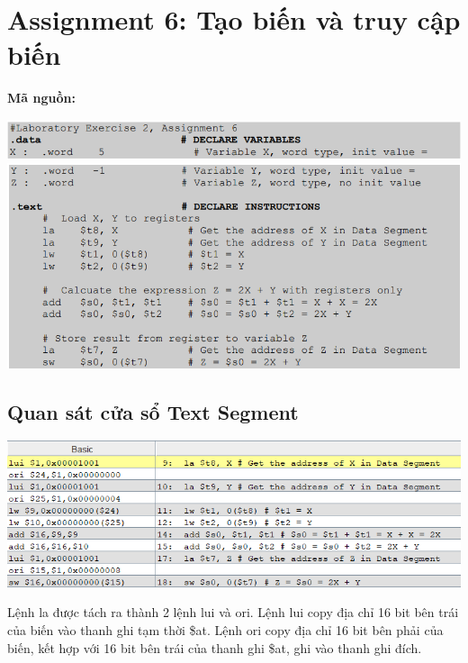 \documentclass[12pt,a4paper,oneside]{article}
\begin{document}
\section{Assignment 6: Tạo biến và truy cập biến}
	\textbf{Mã nguồn:}
	\begin{center}
	\includegraphics[scale=0.8]{image/16}
	\includegraphics[scale=0.8]{image/17}
	\end{center}
	\subsection{Quan sát cửa sổ Text Segment}
	\begin{center}
	\includegraphics[scale=0.8]{image/18}
	\end{center}
	\quad Lệnh la được tách ra thành 2 lệnh lui và ori. Lệnh lui copy địa chỉ 16 bit bên trái của biến vào thanh ghi tạm thời \$at. Lệnh ori copy địa chỉ 16 bit bên phải của biến, kết hợp với 16 bit bên trái của thanh ghi \$at, ghi vào thanh ghi đích.
\end{document}
